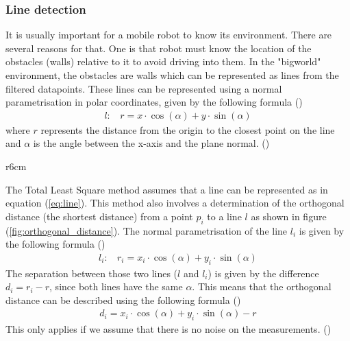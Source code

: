 \documentclass[../Head/Main.tex]{subfiles}
\begin{document}
\subsubsection{Line detection}
\label{subsubsec:DesignLineDection}
It is usually important for a mobile robot to know its environment. There are several reasons for that. One is that robot must know the location of the obstacles (walls) relative to it to avoid driving into them. In the "bigworld" environment, the obstacles are walls which can be represented as lines from the filtered datapoints. These lines can be represented using a normal parametrisation in polar coordinates, given by the following formula (\cite[1-3]{TLSM})
\begin{align}
    l:~~~~r = x\cdot\cos(\alpha)+y\cdot\sin(\alpha)
    \label{eq:line}
\end{align}
where $r$ represents the distance from the origin to the closest point on the line and $\alpha$ is the angle between the x-axis and the plane normal. (\cite[1-3]{TLSM})
\par
\begin{wrapfigure}{r}{6cm}
	\vspace{-12pt}
	\centering
	
	\vspace{-5pt}
	\caption{Orthogonal distance from point $p_1$ to line $l$}
	\label{fig:orthogonal_distance}
	\vspace{-5pt}
\end{wrapfigure}
The Total Least Square method assumes that a line can be represented as in equation (\ref{eq:line}). This method also involves a determination of the orthogonal distance (the shortest distance) from a point $p_i$ to a line $l$ as shown in  figure (\ref{fig:orthogonal_distance}). The normal parametrisation of the line $l_i$ is given by the following formula (\cite[1-3]{TLSM})
\begin{align}
    l_i:~~~~r_i = x_i\cdot\cos(\alpha)+y_i\cdot\sin(\alpha)
\end{align}
The separation between those two lines ($l$ and $l_i$) is given by the difference $d_i=r_i-r$, since both lines have the same $\alpha$. This means that the orthogonal distance can be described using the following formula (\cite[1-3]{TLSM})
\begin{align}
    d_i = x_i\cdot\cos(\alpha)+y_i\cdot\sin(\alpha) - r
\end{align}
This only applies if we assume that there is no noise on the measurements. (\cite[1-3]{TLSM})
\end{document}
